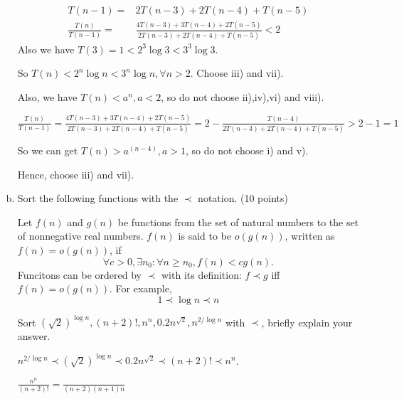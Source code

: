 \documentclass[11pt]{exam}
\begin{document}
\begin{enumerate}[(a)]
\begin{solution}
\begin{align*}
                  T(n-1) =              & 2T(n-3)+2T(n-4)+T(n-5)                                        \\
                  \frac{T(n)}{T(n-1)} = & \frac{ 4T(n-3)+3T(n-4)+2T(n-5)  }{2T(n-3)+2T(n-4)+T(n-5)} < 2
              \end{align*}
              Also we have $T(3) = 1 < 2^3 \log 3<3^3 \log 3$.

              So $T(n)<2^n \log n < 3^n \log n,\forall n>2$.
              Choose iii) and vii).

              Also, we have $T(n) < a^n,a<2$, so do not choose ii),iv),vi) and viii).

              $ \frac{T(n)}{T(n-1)} = \frac{ 4T(n-3)+3T(n-4)+2T(n-5)  }{2T(n-3)+2T(n-4)+T(n-5)} = 2- \frac{T(n-4)}{2T(n-3)+2T(n-4)+T(n-5)} > 2-1 =1$

              So we can get $T(n) > a^{(n-4)},a>1$, so do not choose i) and v).

              Hence, choose iii) and vii).

          \end{solution}

    \item Sort the following functions with the $\prec$ notation. (10 points)
          \begin{definition}
              Let $f(n)$ and $g(n)$ be functions from the set of natural numbers to the set of nonnegative real numbers.
              $f(n)$ is said to be $o(g(n))$, written as $f(n)=o(g(n))$, if
              $$\forall c>0,\exists n_{0}:\forall n\ge n_{0},f(n)<c g(n).$$
              Funcitons can be ordered by $\prec$ with its definition: $f\prec g$ iff $f(n)=o(g(n))$. For example,
              $$1 \prec \log n \prec n$$
          \end{definition}
          Sort $(\sqrt{2})^{\log n}, (n+2)!, n^n, 0.2n^{\sqrt{2}},  n^{2/\log n}$ with $\prec$, briefly explain your answer.
          \begin{solution}
              $ n^{2/\log n} \prec (\sqrt{2})^{\log n} \prec 0.2n^{\sqrt{2}} \prec (n+2)! \prec n^n$.


              $\frac{n^n}{(n+2)!} = \frac{}{(n+2) (n+1) n }$
          \end{solution}
\end{enumerate}
\end{document}
